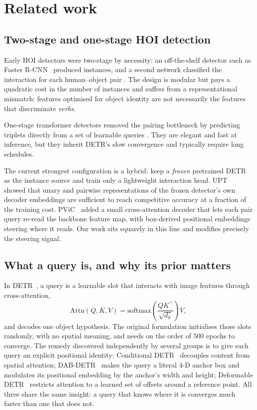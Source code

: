 \documentclass[12pt,a4paper]{article}
\begin{document}
\section{Related work}
\label{sec:related}

\subsection{Two-stage and one-stage HOI detection}
Early HOI detectors were two-stage by necessity: an off-the-shelf detector such
as Faster R-CNN~\cite{ren2015faster} produced instances, and a second network
classified the interaction for each human--object pair
\cite{gkioxari2018interactnet,li2019tin,gupta2019nofrills}. The design is
modular but pays a quadratic cost in the number of instances and suffers from a
representational mismatch: features optimised for object identity are not
necessarily the features that discriminate \emph{verbs}.

One-stage transformer detectors removed the pairing bottleneck by predicting
triplets directly from a set of learnable queries
\cite{tamura2021qpic,kim2021hotr,zou2021hoitrans}. They are elegant and fast at
inference, but they inherit DETR's slow convergence and typically require long
schedules.

The current strongest configuration is a hybrid: keep a \emph{frozen}
pretrained DETR as the instance source and train only a lightweight interaction
head. UPT~\cite{zhang2022upt} showed that unary and pairwise representations of
the frozen detector's own decoder embeddings are sufficient to reach
competitive accuracy at a fraction of the training cost.
PViC~\cite{zhang2023pvic} added a small cross-attention decoder that lets each
pair query re-read the backbone feature map, with box-derived positional
embeddings steering where it reads. Our work sits squarely in this line and
modifies precisely the steering signal.

\subsection{What a query is, and why its prior matters}
In DETR~\cite{carion2020detr}, a query is a learnable slot that interacts with
image features through cross-attention,
\begin{equation}
\mathrm{Attn}(Q,K,V) = \mathrm{softmax}\!\left(\frac{QK^{\!\top}}{\sqrt{d_k}}\right)V ,
\end{equation}
and decodes one object hypothesis. The original formulation initialises those
slots randomly, with no spatial meaning, and needs on the order of $500$ epochs
to converge. The remedy discovered independently by several groups is to give
each query an explicit positional identity: Conditional
DETR~\cite{meng2021conditional} decouples content from spatial attention;
DAB-DETR~\cite{liu2022dabdetr} makes the query a literal 4-D anchor box and
modulates its positional embedding by the anchor's width and height;
Deformable DETR~\cite{zhu2021deformable} restricts attention to a learned set
of offsets around a reference point. All three share the same insight: a query
that knows where it is converges much faster than one that does not.
\end{document}
